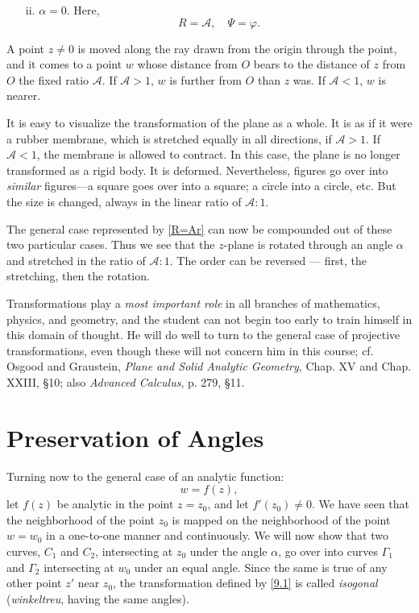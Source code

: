 \documentclass[twosided]{memoir}
\begin{document}
\begin{enumerate}
	\item[ii.] $\alpha =0$. Here,
		\[
			R=\mathcal{A}, \quad \Psi=\varphi
		.\] 
\end{enumerate} 


A point $z\neq 0$ is moved along the ray drawn from the origin through the point, and it comes to a point $w$ whose distance from $O$ bears to the distance of $z$ from $O$ the fixed ratio $\mathcal{A}$. If $\mathcal{A}>1$, $w$ is further from $O$ than $z$ was. If $\mathcal{A}<1$, $w$ is nearer. 

It is easy to visualize the transformation of the plane as a whole. It is as if it were a rubber membrane, which is stretched equally in all directions, if $\mathcal{A}>1$. If $\mathcal{A}<1$, the membrane is allowed to contract. In this case, the plane is no longer transformed as a rigid body. It is deformed. Nevertheless, figures go over into \emph{similar} figures---a square goes over into a square; a circle into a circle, etc. But the size is changed, always in the linear ratio of $\mathcal{A}:1$. 

The general case represented by \ref{R=Ar} can now be compounded out of these two particular cases. Thus we see that the $z$-plane is rotated through an angle $\alpha $ and stretched in the ratio of $\mathcal{A}: 1$. The order can be reversed --- first, the stretching, then the rotation. 

Transformations play a \emph{most important role} in all branches of mathematics, physics, and geometry, and the student can not begin too early to train himself in this domain of thought. He will do well to turn to the general case of projective transformations, even though these will not concern him in this course; cf. Osgood and Graustein, \emph{Plane and Solid Analytic Geometry}, Chap. XV and Chap. XXIII, \S 10; also \emph{Advanced Calculus}, p. 279, \S 11. 

\section{Preservation of Angles}
Turning now to the general case of an analytic function:
\begin{equation}\label{9.1}
	w=f(z),
\end{equation}
let $f(z)$ be analytic in the point $z=z_0$, and let $f'(z_0)\neq 0$. We have seen that the neighborhood of the point $z_0$ is mapped on the neighborhood of the point $w=w_0$ in a one-to-one manner and continuously. We will now show that two curves, $C_1$ and $C_2$, intersecting at $z_0$ under the angle $\alpha $, go over into curves $\Gamma_1$ and $\Gamma_2$ intersecting at $w_0$ under an equal angle. Since the same is true of any other point $z'$ near $z_0$, the transformation defined by \ref{9.1} is called \emph{isogonal} (\emph{winkeltreu}, having the same angles).
\end{document}
